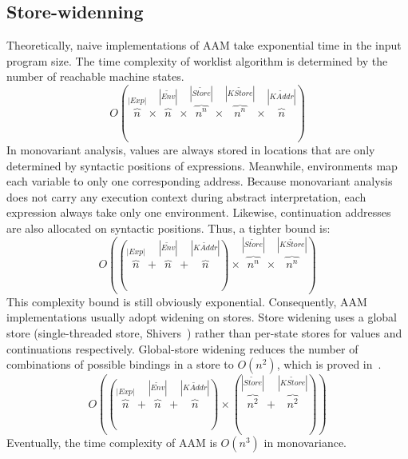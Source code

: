 \documentclass{article}
\begin{document}
\subsection{Store-widenning}
\label{sub:Store-widenning}
Theoretically, naive implementations of AAM take exponential time in the input program size.
The time complexity of worklist algorithm is determined by the number of reachable machine states.
\[
O(
\overbrace{n}^{|Exp|} \times \overbrace{n}^{|\widetilde{Env}|} \times \overbrace{n^n}^{|\widetilde{Store}|}
\times \overbrace{n^n}^{|\widetilde{KStore}|} \times \overbrace{n}^{|\widetilde{KAddr}|}
)
\]
In monovariant analysis, values are always stored in locations that are only determined by syntactic positions of expressions.
Meanwhile, environments map each variable to only one corresponding address.
Because monovariant analysis does not carry any execution context during abstract interpretation, each expression always take only one environment.
Likewise, continuation addresses are also allocated on syntactic positions.
Thus, a tighter bound is:
\[
O(
(\overbrace{n}^{|Exp|} + \overbrace{n}^{|\widetilde{Env}|} +  \overbrace{n}^{|\widetilde{KAddr}|}) \times \overbrace{n^n}^{|\widetilde{Store}|} \times \overbrace{n^n}^{|\widetilde{KStore}|}
)
\]
This complexity bound is still obviously exponential.
Consequently, AAM implementations usually adopt widening on stores.
Store widening uses a global store (single-threaded store, Shivers~\cite{shivers1991control}) rather than per-state stores for values and continuations respectively.
Global-store widening reduces the number of combinations of possible bindings in a store to $O(n^2)$,
which is proved in~\cite{van2010abstracting, gilray2016pushdown}.
\[
O(
(\overbrace{n}^{|Exp|} + \overbrace{n}^{|\widetilde{Env}|} +  \overbrace{n}^{|\widetilde{KAddr}|}) \times (\overbrace{n^2}^{|\widetilde{Store}|} + \overbrace{n^2}^{|\widetilde{KStore}|})
)
\]
Eventually, the time complexity of AAM is $O(n^3)$ in monovariance.
\end{document}
